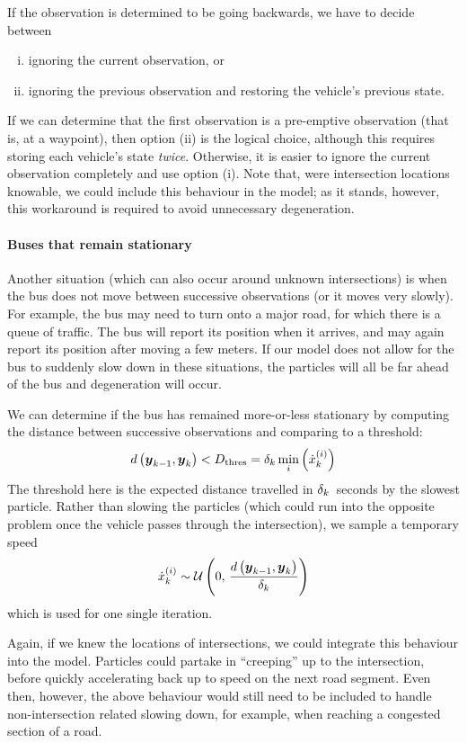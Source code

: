If the observation is determined to be going backwards, we have to decide between
\begin{enumerate}[i.]
\item ignoring the current observation, or
\item ignoring the previous observation and restoring the vehicle's previous state.
\end{enumerate}
If we can determine that the first observation is a pre-emptive observation (that is, at a waypoint), then option (ii) is the logical choice, although this requires storing each vehicle's state \emph{twice}. Otherwise, it is easier to ignore the current observation completely and use option (i). Note that, were intersection locations knowable, we could include this behaviour in the model; as it stands, however, this workaround is required to avoid unnecessary degeneration.


\paragraph{Buses that remain stationary}

Another situation (which can also occur around unknown intersections) is when the bus does not move between successive observations (or it moves very slowly). For example, the bus may need to turn onto a major road, for which there is a queue of traffic. The bus will report its position when it arrives, and may again report its position after moving a few meters. If our model does not allow for the bus to suddenly slow down in these situations, the particles will all be far ahead of the bus and degeneration will occur.


We can determine if the bus has remained more-or-less stationary by computing the distance between successive observations and comparing to a threshold:
\begin{equation}
\label{eq:vehicle_dist_check}
d\left(\boldsymbol{y}_{k-1}, \boldsymbol{y}_k\right) < D_\text{thres} =
\delta_k \min_i\left(\dot x_k^{(i)}\right)
\end{equation}
The threshold here is the expected distance travelled in $\delta_k$~seconds by the slowest particle. Rather than slowing the particles (which could run into the opposite problem once the vehicle passes through the intersection), we sample a temporary speed
\begin{equation}
\label{eq:vehicle_temp_speed}
\dot x_k^{(i)} \sim
\mathcal{U}\left(0,\, \frac{d\left(\boldsymbol{y}_{k-1}, \boldsymbol{y}_k\right)}{\delta_k}\right)
\end{equation}
which is used for one single iteration.

Again, if we knew the locations of intersections, we could integrate this behaviour into the model. Particles could partake in ``creeping'' up to the intersection, before quickly accelerating back up to speed on the next road segment. Even then, however, the above behaviour would still need to be included to handle non-intersection related slowing down, for example, when reaching a congested section of a road.
